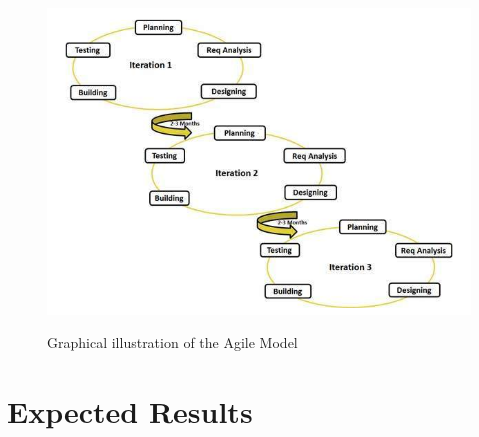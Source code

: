 \begin{figure}[htbp]
\center \includegraphics[width=400pt]{Figures/sdlc_agile_model}\\
\caption{Graphical illustration of the Agile Model \citep{TP-16}} \label{Figure: Graphical illustration of the Agile Model}
\end{figure}

\section{Expected Results}

